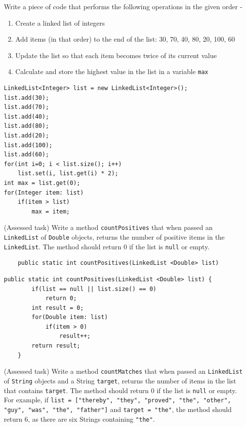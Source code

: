 \begin{questions}
Write a piece of code that performs the following operations in the given order -

\begin{enumerate}
	\item Create a linked list of integers
	\item Add items (in that order) to the end of the list: 30, 70, 40, 80, 20, 100, 60
	\item Update the list so that each item becomes twice of its current value
	\item Calculate and store the highest value in the list in a variable \texttt{max}
\end{enumerate}

\begin{solution}
	\begin{lstlisting}
LinkedList<Integer> list = new LinkedList<Integer>();
list.add(30);
list.add(70);
list.add(40);
list.add(80);
list.add(20);
list.add(100);
list.add(60);
for(int i=0; i < list.size(); i++)
	list.set(i, list.get(i) * 2);
int max = list.get(0);
for(Integer item: list)
	if(item > list)
		max = item;
	\end{lstlisting}
\end{solution}

\question (Assessed task) Write a method \texttt{countPositives} that when passed an \texttt{LinkedList} of \texttt{Double} objects, returns the number of positive items in the \texttt{LinkedList}. The method should return 0 if the list is \texttt{null} or empty.

\begin{lstlisting}
	public static int countPositives(LinkedList <Double> list)
\end{lstlisting}

\begin{solution}
\begin{lstlisting}
public static int countPositives(LinkedList <Double> list) {
		if(list == null || list.size() == 0) 
			return 0;
		int result = 0;
		for(Double item: list)
			if(item > 0)
				result++;
		return result;
	}	
\end{lstlisting}	
\end{solution}


\question (Assessed task) Write a method \texttt{countMatches} that when passed an \texttt{LinkedList} of \texttt{String} objects and a String \texttt{target}, returns the number of items in the list that contains \texttt{target}. The method should return 0 if the list is \texttt{null} or empty. For example, if \texttt{list = ["thereby", "they", "proved", "the", "other", "guy", "was", "the", "father"]} and \texttt{target = "the"}, the method should return 6, as there are six Strings containing \texttt{"the"}.


\end{questions}
